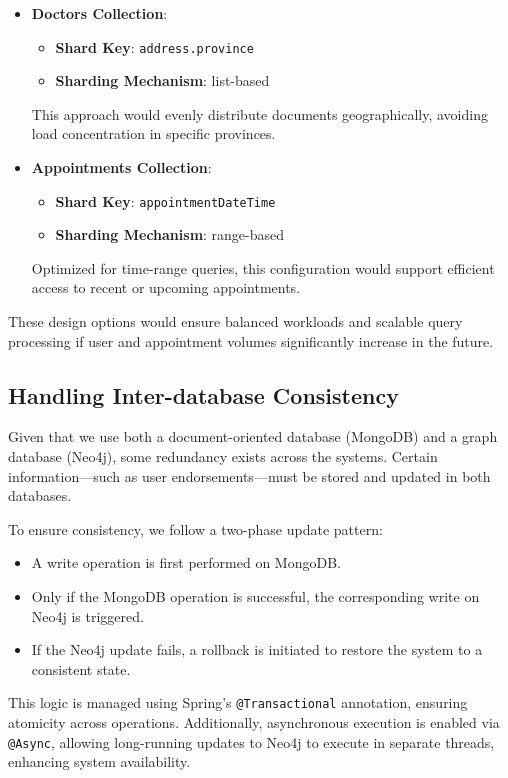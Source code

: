 \begin{itemize}
  \item \textbf{Doctors Collection}:
    \begin{itemize}
      \item \textbf{Shard Key}: \texttt{address.province}
      \item \textbf{Sharding Mechanism}: list-based
    \end{itemize}
    This approach would evenly distribute documents geographically, avoiding load concentration in specific provinces.

  \item \textbf{Appointments Collection}:
    \begin{itemize}
      \item \textbf{Shard Key}: \texttt{appointmentDateTime}
      \item \textbf{Sharding Mechanism}: range-based
    \end{itemize}
    Optimized for time-range queries, this configuration would support efficient access to recent or upcoming appointments.
\end{itemize}

These design options would ensure balanced workloads and scalable query processing if user and appointment volumes significantly increase in the future.

\subsection{Handling Inter-database Consistency}

Given that we use both a document-oriented database (MongoDB) and a graph database (Neo4j), some redundancy exists across the systems. Certain information—such as user endorsements—must be stored and updated in both databases.

To ensure consistency, we follow a two-phase update pattern:
\begin{itemize}
  \item A write operation is first performed on MongoDB.
  \item Only if the MongoDB operation is successful, the corresponding write on Neo4j is triggered.
  \item If the Neo4j update fails, a rollback is initiated to restore the system to a consistent state.
\end{itemize}

This logic is managed using Spring’s \texttt{@Transactional} annotation, ensuring atomicity across operations. Additionally, asynchronous execution is enabled via \texttt{@Async}, allowing long-running updates to Neo4j to execute in separate threads, enhancing system availability.

